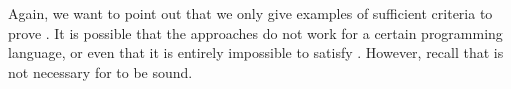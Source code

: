 Again, we want to point out that we only give examples of sufficient criteria to prove .
It is possible that the approaches do not work for a certain programming language, or even that it is entirely impossible to satisfy .
However, recall that  is not necessary for \gvl to be sound.